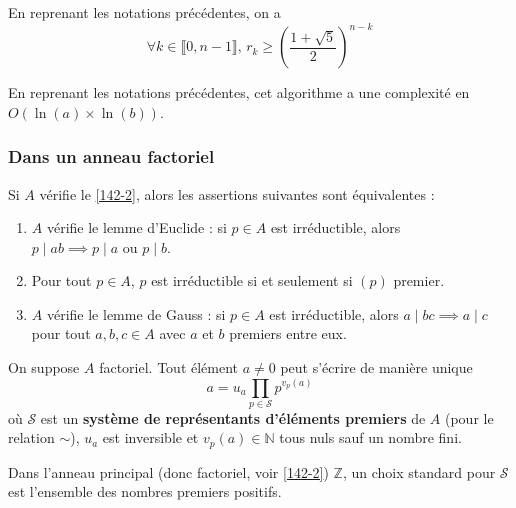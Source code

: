 
	\begin{proposition}
		En reprenant les notations précédentes, on a
		\[ \forall k \in \llbracket 0,n-1 \rrbracket, \, r_k \geq \left( \frac{1+\sqrt{5}}{2} \right)^{n-k} \]
	\end{proposition}

	\begin{corollary}
		En reprenant les notations précédentes, cet algorithme a une complexité en $O(\ln(a) \times \ln(b))$.
	\end{corollary}

	\subsubsection{Dans un anneau factoriel}


	\begin{proposition}
		Si $A$ vérifie le \cref{142-2}, alors les assertions suivantes sont équivalentes :
		\begin{enumerate}[label=(\roman*)]
			\item $A$ vérifie le lemme d'Euclide : si $p \in A$ est irréductible, alors $p \mid ab \implies p \mid a \text { ou } p \mid b$.
			\item Pour tout $p \in A$, $p$ est irréductible si et seulement si $(p)$ premier.
			\item $A$ vérifie le lemme de Gauss : si $p \in A$ est irréductible, alors $a \mid bc \implies a \mid c$ pour tout $a, b, c \in A$ avec $a$ et $b$ premiers entre eux.
		\end{enumerate}
	\end{proposition}

	\reference[ULM18]{65}

	\begin{proposition}
		On suppose $A$ factoriel. Tout élément $a \neq 0$ peut s'écrire de manière unique
		\[ a = u_a \prod_{p \in \mathcal{S}} p^{v_p(a)} \]
		où $\mathcal{S}$ est un \textbf{système de représentants d'éléments premiers} de $A$ (pour le relation $\sim$), $u_a$ est inversible et $v_p(a) \in \mathbb{N}$ tous nuls sauf un nombre fini.
	\end{proposition}

	\begin{example}
		Dans l'anneau principal (donc factoriel, voir \cref{142-2}) $\mathbb{Z}$, un choix standard pour $\mathcal{S}$ est l'ensemble des nombres premiers positifs.
	\end{example}

